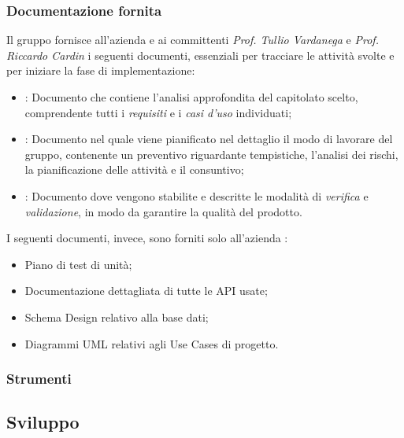 \subsubsection{Documentazione fornita}
Il gruppo fornisce all'azienda \proponente{} e ai committenti \textit{Prof. Tullio Vardanega} e \textit{Prof. Riccardo Cardin} i seguenti documenti, essenziali per tracciare le attività svolte e per iniziare la fase di implementazione:
\begin{itemize}
	\item \AdR{}: Documento che contiene l'analisi approfondita del capitolato scelto, comprendente tutti i \emph{requisiti} e i \emph{casi d'uso} individuati;
	\item \PdP{}: Documento nel quale viene pianificato nel dettaglio il modo di lavorare del gruppo, contenente un preventivo riguardante tempistiche, l'analisi dei rischi, la pianificazione delle attività e il consuntivo;
	\item \PdQ{}: Documento dove vengono stabilite e descritte le modalità di \emph{verifica} e \emph{validazione}, in modo da garantire la qualità del prodotto.  \\
\end{itemize}
I seguenti documenti, invece, sono forniti solo all'azienda \proponente{}:	%
\begin{itemize}
	\item Piano di test di unità;
	\item Documentazione dettagliata di tutte le API usate;
	\item Schema Design relativo alla base dati;
	\item Diagrammi UML relativi agli Use Cases di progetto. %
\end{itemize}

\subsubsection{Strumenti} %

\subsection{Sviluppo}

